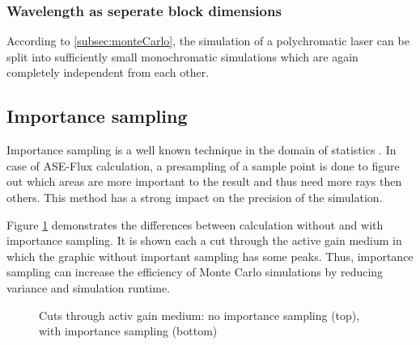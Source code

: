 \subsubsection{Wavelength as seperate block dimensions}
    According to \ref{subsec:monteCarlo}, the simulation of a polychromatic
    laser can be split into sufficiently small monochromatic simulations which
    are again completely independent from each other.


\subsection{Importance sampling}
\label{subsec:importance_sampling}
Importance sampling is a well known technique in the domain
of statistics \cite{importanceSamplingSource}. In case of 
ASE-Flux calculation, a presampling of a sample point is done
to figure out which areas are more important to the result
and thus need more rays then others. This method has a strong
impact on the precision of the simulation.

Figure \ref{graphic:importance} demonstrates
the differences between calculation without and with
importance sampling. It is shown each a cut through the active
gain medium in which the graphic without important
sampling has some peaks. Thus, importance 
sampling can increase the efficiency of Monte Carlo simulations 
by reducing variance and simulation runtime. 
\begin{figure}
  \centerline
  {}
  \caption{Cuts through activ gain medium: no importance sampling (top), with importance sampling (bottom)}
  \label{graphic:importance}
\end{figure}

